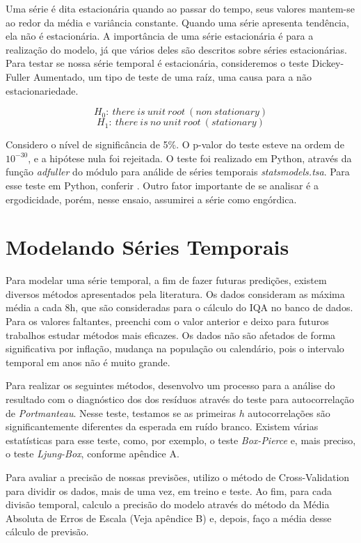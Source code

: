 Uma série é dita estacionária quando ao passar do tempo, seus valores
mantem-se ao redor da média e variância constante. Quando uma série apresenta
tendência, ela não é estacionária. A importância de uma série estacionária é
para a realização do modelo, já que vários deles são descritos sobre séries
estacionárias. Para testar se nossa série temporal é estacionária,
consideremos o teste Dickey-Fuller Aumentado, um tipo de teste de uma raíz,
uma causa para a não estacionariedade.

$$H_0 : ~there~is~unit~root~(non~stationary)$$
$$H_1 : ~there~is~no~unit~root~(stationary)$$

Considero o nível de significância de 5\%. O p-valor do teste esteve na ordem
de $10^{-30}$, e a hipótese nula foi rejeitada. O teste foi realizado em
Python, através da função \textit{adfuller} do módulo para análide de séries
temporais \textit{statsmodels.tsa}. Para esse teste em Python, conferir
\cite{adf-test}. Outro fator importante de se analisar é a ergodicidade,
porém, nesse ensaio, assumirei a série como engórdica. 

\section{Modelando Séries Temporais}

Para modelar uma série temporal, a fim de fazer futuras predições, existem
diversos métodos apresentados pela literatura. Os dados consideram as máxima
média a cada 8h, que são consideradas para o cálculo do IQA no banco de dados.
Para os valores faltantes, preenchi com o valor anterior e deixo para futuros
trabalhos estudar métodos mais eficazes. Os dados não são afetados de forma
significativa por inflação, mudança na população ou calendário, pois o
intervalo temporal em anos não é muito grande. 

Para realizar os seguintes métodos, desenvolvo um processo para a análise do
resultado com o diagnóstico dos dos resíduos através do teste para
autocorrelação de \textit{Portmanteau}. Nesse teste, testamos se as primeiras $h$
autocorrelações são significantemente diferentes da esperada em ruído branco.
Existem várias estatísticas para esse teste, como, por exemplo, o teste
\textit{Box-Pierce} e, mais preciso, o teste \textit{Ljung-Box}, conforme
apêndice A. 

Para avaliar a precisão de nossas previsões, utilizo o método de
Cross-Validation para dividir os dados, mais de uma vez, em treino e teste. Ao
fim, para cada divisão temporal, calculo a precisão do modelo através do
método da Média Absoluta de Erros de Escala (Veja apêndice B) e, depois, faço
a média desse cálculo de previsão. 

